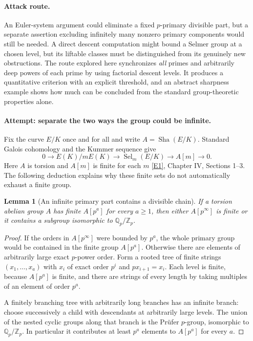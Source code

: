 \documentclass[11pt,a4paper]{article}
\newcommand{\Z}{\mathbb{Z}}
\newcommand{\Q}{\mathbb{Q}}
\newcommand{\eref}[2]{\hyperlink{extra:#1:#2}{[E#2]}}
\newtheorem{notebooklemma}{Lemma}[section]
\numberwithin{equation}{section}
\begin{document}
\paragraph{Attack route.}
An Euler-system argument could eliminate a fixed $p$-primary divisible part, but a separate assertion excluding infinitely many nonzero primary components would still be needed. A direct descent computation might bound a Selmer group at a chosen level, but its liftable classes must be distinguished from its genuinely new obstructions. The route explored here synchronizes \emph{all} primes and arbitrarily deep powers of each prime by using factorial descent levels. It produces a quantitative criterion with an explicit threshold, and an abstract sharpness example shows how much can be concluded from the standard group-theoretic properties alone.

\paragraph{Attempt: separate the two ways the group could be infinite.}
Fix the curve $E/K$ once and for all and write $A=\operatorname{Sha}(E/K)$. Standard Galois cohomology and the Kummer sequence give
\begin{equation}\label{r59:kummer}
 0\longrightarrow E(K)/mE(K)\longrightarrow
       \operatorname{Sel}_m(E/K)\longrightarrow A[m]\longrightarrow0.
\end{equation}
Here $A$ is torsion and $A[m]$ is finite for each $m$ \eref{30006701}{1}, Chapter IV, Sections 1--3. The following deduction explains why these finite sets do not automatically exhaust a finite group.

\begin{notebooklemma}[An infinite primary part contains a divisible chain]\label{r59:prufer}
If a torsion abelian group $A$ has finite $A[p^a]$ for every $a\geq1$, then either $A[p^\infty]$ is finite or it contains a subgroup isomorphic to $\Q_p/\Z_p$.
\end{notebooklemma}
\begin{proof}
If the orders in $A[p^\infty]$ were bounded by $p^a$, the whole primary group would be contained in the finite group $A[p^a]$. Otherwise there are elements of arbitrarily large exact $p$-power order. Form a rooted tree of finite strings $(x_1,\ldots,x_a)$ with $x_i$ of exact order $p^i$ and $px_{i+1}=x_i$. Each level is finite, because $A[p^a]$ is finite, and there are strings of every length by taking multiples of an element of order $p^a$.

A finitely branching tree with arbitrarily long branches has an infinite branch: choose successively a child with descendants at arbitrarily large levels. The union of the nested cyclic groups along that branch is the Pr\"ufer $p$-group, isomorphic to $\Q_p/\Z_p$. In particular it contributes at least $p^a$ elements to $A[p^a]$ for every $a$.
\end{proof}
\end{document}
